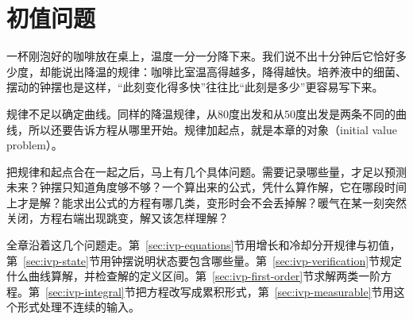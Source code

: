 \chapter{初值问题}
\label{chap:ordinary-differential-equations}

一杯刚泡好的咖啡放在桌上，温度一分一分降下来。我们说不出十分钟后它恰好多少度，却能说出降温的规律：咖啡比室温高得越多，降得越快。培养液中的细菌、摆动的钟摆也是这样，“此刻变化得多快”往往比“此刻是多少”更容易写下来。

规律不足以确定曲线。同样的降温规律，从$80$度出发和从$50$度出发是两条不同的曲线，所以还要告诉方程从哪里开始。规律加起点，就是本章的对象（initial value problem）。

把规律和起点合在一起之后，马上有几个具体问题。需要记录哪些量，才足以预测未来？钟摆只知道角度够不够？一个算出来的公式，凭什么算作解，它在哪段时间上才是解？能求出公式的方程有哪几类，变形时会不会丢掉解？暖气在某一刻突然关闭，方程右端出现跳变，解又该怎样理解？

全章沿着这几个问题走。第~\ref{sec:ivp-equations}节用增长和冷却分开规律与初值，第~\ref{sec:ivp-state}节用钟摆说明状态要包含哪些量。第~\ref{sec:ivp-verification}节规定什么曲线算解，并检查解的定义区间。第~\ref{sec:ivp-first-order}节求解两类一阶方程。第~\ref{sec:ivp-integral}节把方程改写成累积形式，第~\ref{sec:ivp-measurable}节用这个形式处理不连续的输入。








